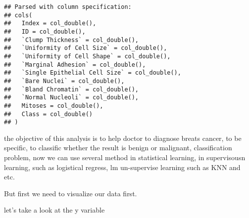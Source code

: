 \documentclass[]{article}
\newenvironment{Shaded}{\begin{snugshade}}{\end{snugshade}}
\newcommand{\DataTypeTok}[1]{\textcolor[rgb]{0.13,0.29,0.53}{#1}}
\newcommand{\DecValTok}[1]{\textcolor[rgb]{0.00,0.00,0.81}{#1}}
\newcommand{\KeywordTok}[1]{\textcolor[rgb]{0.13,0.29,0.53}{\textbf{#1}}}
\newcommand{\NormalTok}[1]{#1}
\newcommand{\OperatorTok}[1]{\textcolor[rgb]{0.81,0.36,0.00}{\textbf{#1}}}
\newcommand{\StringTok}[1]{\textcolor[rgb]{0.31,0.60,0.02}{#1}}
\begin{document}
\begin{verbatim}
## Parsed with column specification:
## cols(
##   Index = col_double(),
##   ID = col_double(),
##   `Clump Thickness` = col_double(),
##   `Uniformity of Cell Size` = col_double(),
##   `Uniformity of Cell Shape` = col_double(),
##   `Marginal Adhesion` = col_double(),
##   `Single Epithelial Cell Size` = col_double(),
##   `Bare Nuclei` = col_double(),
##   `Bland Chromatin` = col_double(),
##   `Normal Nucleoli` = col_double(),
##   Mitoses = col_double(),
##   Class = col_double()
## )
\end{verbatim}

\begin{Shaded}
\end{Shaded}

the objective of this analysis is to help doctor to diagnose breats
cancer, to be specific, to classific whether the result is benign or
malignant, classification problem, now we can use several method in
statistical learning, in supervisousn learning, such as logistical
regress, lm un-supervise learning such as KNN and etc.

But first we need to visualize our data first.

let's take a look at the y variable
\end{document}
